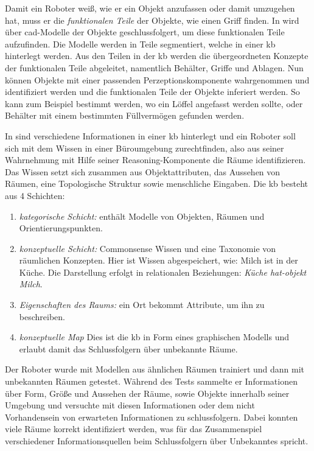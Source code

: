 Damit ein Roboter weiß, wie er ein Objekt anzufassen oder damit umzugehen hat, muss er die \textit{funktionalen Teile} der Objekte, wie einen Griff finden. In \cite{reasoningFuncParts} wird über \gls{cad}-Modelle der Objekte geschlussfolgert, um diese funktionalen Teile aufzufinden. Die Modelle werden in Teile segmentiert, welche in einer \gls{kb} hinterlegt werden. Aus den Teilen in der \gls{kb} werden die übergeordneten Konzepte der funktionalen Teile abgeleitet, namentlich Behälter, Griffe und Ablagen. Nun können Objekte mit einer passenden Perzeptionskomponente wahrgenommen und identifiziert werden und die funktionalen Teile der Objekte inferiert werden. So kann zum Beispiel bestimmt werden, wo ein Löffel angefasst werden sollte, oder Behälter mit einem bestimmten Füllvermögen gefunden werden. \par

In \cite{pronobis1} sind verschiedene Informationen in einer \gls{kb} hinterlegt und ein Roboter soll sich mit dem Wissen in einer Büroumgebung zurechtfinden, also aus seiner Wahrnehmung mit Hilfe seiner Reasoning-Komponente die Räume identifizieren. Das Wissen setzt sich zusammen aus Objektattributen, das Aussehen von Räumen, eine Topologische Struktur sowie menschliche Eingaben. Die \gls{kb} besteht aus 4 Schichten: 
\begin{enumerate}
	\item \textit{kategorische Schicht:} enthält Modelle von Objekten, Räumen und Orientierungspunkten.
	\item \textit{konzeptuelle Schicht:} Commonsense Wissen und eine Taxonomie von räumlichen Konzepten. Hier ist Wissen abgespeichert, wie: Milch ist in der Küche. Die Darstellung erfolgt in relationalen Beziehungen: \textit{Küche hat-objekt Milch}.
	\item \textit{Eigenschaften des Raums:} ein Ort bekommt Attribute, um ihn zu beschreiben.
	\item \textit{konzeptuelle Map} Dies ist die \gls{kb} in Form eines graphischen Modells und erlaubt damit das Schlussfolgern über unbekannte Räume. 
\end{enumerate}
Der Roboter wurde mit Modellen aus ähnlichen Räumen trainiert und dann mit unbekannten Räumen getestet. Während des Tests sammelte er Informationen über Form, Größe und Aussehen der Räume, sowie Objekte innerhalb seiner Umgebung und versuchte mit diesen Informationen oder dem nicht Vorhandensein von erwarteten Informationen zu schlussfolgern. Dabei konnten viele Räume korrekt identifiziert werden, was für das Zusammenspiel verschiedener Informationsquellen beim Schlussfolgern über Unbekanntes spricht. \par

